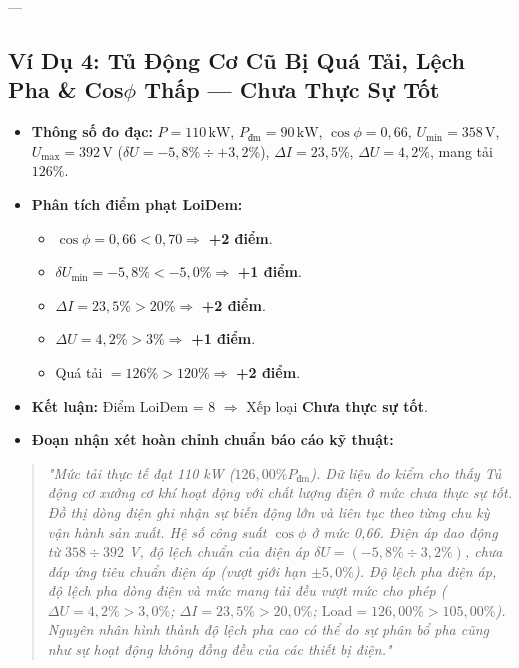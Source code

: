 \documentclass[12pt,a4paper]{article}
\begin{document}
---

\subsection{\texorpdfstring{Ví Dụ 4: Tủ Động Cơ Cũ Bị Quá Tải, Lệch Pha \& Cos$\phi$ Thấp --- Chưa Thực Sự Tốt}{Ví Dụ 4: Tủ Động Cơ Cũ Bị Quá Tải, Lệch Pha và Cos phi Thấp --- Chưa Thực Sự Tốt}}

\begin{itemize}
  \item \textbf{Thông số đo đạc:} $P = 110\,\mathrm{kW}$, $P_{\text{đm}} = 90\,\mathrm{kW}$, $\cos\phi = 0{,}66$, $U_{\min} = 358\,\mathrm{V}$, $U_{\max} = 392\,\mathrm{V}$ ($\delta U = -5{,}8\% \div +3{,}2\%$), $\Delta I = 23{,}5\%$, $\Delta U = 4{,}2\%$, mang tải $126\%$.
  \item \textbf{Phân tích điểm phạt LoiDem:}
  \begin{itemize}
    \item $\cos\phi = 0{,}66 < 0{,}70 \Rightarrow$ \textbf{+2 điểm}.
    \item $\delta U_{\min} = -5{,}8\% < -5{,}0\% \Rightarrow$ \textbf{+1 điểm}.
    \item $\Delta I = 23{,}5\% > 20\% \Rightarrow$ \textbf{+2 điểm}.
    \item $\Delta U = 4{,}2\% > 3\% \Rightarrow$ \textbf{+1 điểm}.
    \item Quá tải $= 126\% > 120\% \Rightarrow$ \textbf{+2 điểm}.
  \end{itemize}
  \item \textbf{Kết luận:} Điểm LoiDem = 8 $\Rightarrow$ Xếp loại \textbf{\color{accent}Chưa thực sự tốt}.
  \item \textbf{Đoạn nhận xét hoàn chỉnh chuẩn báo cáo kỹ thuật:}
\end{itemize}

\begin{quote}\itshape
"Mức tải thực tế đạt 110 kW ($126{,}00\% P_{\text{đm}}$). Dữ liệu đo kiểm cho thấy Tủ động cơ xưởng cơ khí hoạt động với chất lượng điện ở mức chưa thực sự tốt. Đồ thị dòng điện ghi nhận sự biến động lớn và liên tục theo từng chu kỳ vận hành sản xuất. Hệ số công suất $\cos\phi$ ở mức 0,66. Điện áp dao động từ $358 \div 392$ V, độ lệch chuẩn của điện áp $\delta U = (-5{,}8\% \div 3{,}2\%)$, chưa đáp ứng tiêu chuẩn điện áp (vượt giới hạn $\pm 5{,}0\%$). Độ lệch pha điện áp, độ lệch pha dòng điện và mức mang tải đều vượt mức cho phép ($\Delta U = 4{,}2\% > 3{,}0\%$; $\Delta I = 23{,}5\% > 20{,}0\%$; $\mathrm{Load} = 126{,}00\% > 105{,}00\%$). Nguyên nhân hình thành độ lệch pha cao có thể do sự phân bổ pha cũng như sự hoạt động không đồng đều của các thiết bị điện."
\end{quote}
\end{document}
